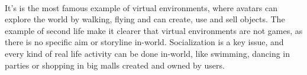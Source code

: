 \paragraph{}
It's is the most famous example of virtual environments, where avatars can explore the world by walking, flying and can create, use and sell objects. The example of second life make it clearer that virtual environments are not games, as there is no specific aim or storyline in-world. Socialization is a key issue, and every kind of real life activity can be done in-world, like swimming, dancing in parties or shopping in big malls created and owned by users.
  
